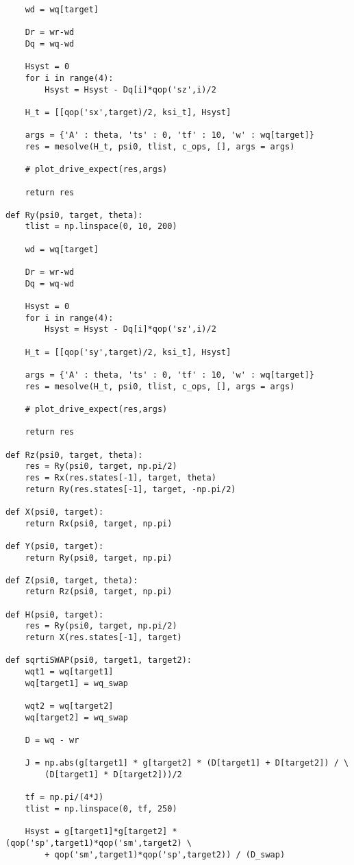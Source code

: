 \begin{verbatim}
    wd = wq[target]

    Dr = wr-wd
    Dq = wq-wd

    Hsyst = 0
    for i in range(4):
        Hsyst = Hsyst - Dq[i]*qop('sz',i)/2

    H_t = [[qop('sx',target)/2, ksi_t], Hsyst]

    args = {'A' : theta, 'ts' : 0, 'tf' : 10, 'w' : wq[target]}
    res = mesolve(H_t, psi0, tlist, c_ops, [], args = args)

    # plot_drive_expect(res,args)

    return res

def Ry(psi0, target, theta):
    tlist = np.linspace(0, 10, 200)

    wd = wq[target]

    Dr = wr-wd
    Dq = wq-wd

    Hsyst = 0
    for i in range(4):
        Hsyst = Hsyst - Dq[i]*qop('sz',i)/2

    H_t = [[qop('sy',target)/2, ksi_t], Hsyst]

    args = {'A' : theta, 'ts' : 0, 'tf' : 10, 'w' : wq[target]}
    res = mesolve(H_t, psi0, tlist, c_ops, [], args = args)

    # plot_drive_expect(res,args)

    return res

def Rz(psi0, target, theta):
    res = Ry(psi0, target, np.pi/2)
    res = Rx(res.states[-1], target, theta)
    return Ry(res.states[-1], target, -np.pi/2)

def X(psi0, target):
    return Rx(psi0, target, np.pi)

def Y(psi0, target):
    return Ry(psi0, target, np.pi)

def Z(psi0, target, theta):
    return Rz(psi0, target, np.pi)

def H(psi0, target):
    res = Ry(psi0, target, np.pi/2)
    return X(res.states[-1], target)

def sqrtiSWAP(psi0, target1, target2):
    wqt1 = wq[target1]
    wq[target1] = wq_swap
    
    wqt2 = wq[target2]
    wq[target2] = wq_swap

    D = wq - wr

    J = np.abs(g[target1] * g[target2] * (D[target1] + D[target2]) / \
        (D[target1] * D[target2]))/2

    tf = np.pi/(4*J)
    tlist = np.linspace(0, tf, 250)

    Hsyst = g[target1]*g[target2] * (qop('sp',target1)*qop('sm',target2) \
        + qop('sm',target1)*qop('sp',target2)) / (D_swap)


\end{verbatim}

